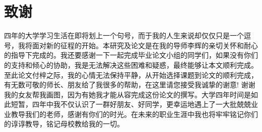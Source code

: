 \chapter*{致谢}
四年的大学学习生活在即将划上一个句号，而于我的人生来说却仅仅只是一个逗号，我将面对新的征程的开始。本研究及论文是在我的导师李辉的亲切关怀和耐心的指导下完成的。我还要感谢一下一起完成毕业论文小组的同学们，如果没有你们的支持和倾心的协助，我是无法解决这些困难和疑惑，最终能够让本文顺利完成。至此论文付梓之际，我的心情无法保持平静，从开始选择课题到论文的顺利完成，有无数可敬的师长、朋友给了我很多的帮助，在这里请您接受我诚挚的谢意! 谢谢我的女友帮我画图，因为有她我才能从容完成这份论文的撰写。大学四年时间是如此短暂，四年中我不仅认识了一群好朋友、好同学，更幸运地遇上了一大批兢兢业业教导我们的老师，感谢有你们的时光。在未来的职业生涯中我也将牢牢铭记你们的谆谆教导，铭记母校教给我的一切。